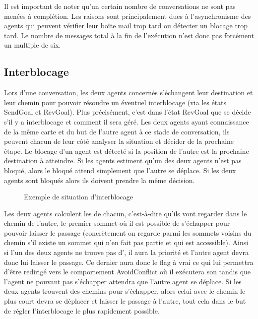 \documentclass[11pt]{article}
\newcommand{\vertex}{\node[vertex]}
\begin{document}
Il est important de noter qu'un certain nombre de conversations ne sont pas menées à complétion. Les raisons sont principalement dues à l'asynchronisme des agents qui peuvent vérifier leur boîte mail trop tard ou détecter un blocage trop tard. Le nombre de messages total à la fin de l'exécution n'est donc pas forcément un multiple de six.

\subsection{Interblocage}

Lors d'une conversation, les deux agents concernés s'échangent leur destination et leur chemin pour pouvoir résoudre un éventuel interblocage (via les états \textsf{SendGoal} et \textsf{RcvGoal}). Plus précisément, c'est dans l'état \textsf{RcvGoal} que se décide s'il y a interblocage et comment il sera géré. Les deux agents ayant connaissance de la même carte et du but de l'autre agent à ce stade de conversation, ils peuvent chacun de leur côté analyser la situation et décider de la prochaine étape. Le blocage d'un agent est détecté si la position de l'autre est la prochaine destination à atteindre. Si les agents estiment qu'un des deux agents n'est pas bloqué, alors le bloqué attend simplement que l'autre se déplace. Si les deux agents sont bloqués alors ils doivent prendre la même décision.

\begin{figure}[ht!]
\centering
{}
\caption{Exemple de situation d'interblocage}
\label{fig-deadlock}
\end{figure}
Les deux agents calculent les  de chacun, c'est-à-dire qu'ils vont regarder dans le chemin de l'autre, le premier sommet où il est possible de s'échapper pour pouvoir laisser le passage (concrètement on regarde parmi les sommets voisins du chemin s'il existe un sommet qui n'en fait pas partie et qui est accessible). Ainsi si l'un des deux agents ne trouve pas d', il aura la priorité et l'autre agent devra donc lui laisser le passage. Ce dernier aura donc le flag  à vrai ce qui lui permettra d'être redirigé vers le comportement \textsf{AvoidConflict} où il exécutera son  tandis que l'agent ne pouvant pas s'échapper attendra que l'autre agent se déplace. Si les deux agents trouvent des chemins pour s'échapper, alors celui avec le chemin le plus court devra se déplacer et laisser le passage à l'autre, tout cela dans le but de régler l'interblocage le plus rapidement possible.  
\end{document}
